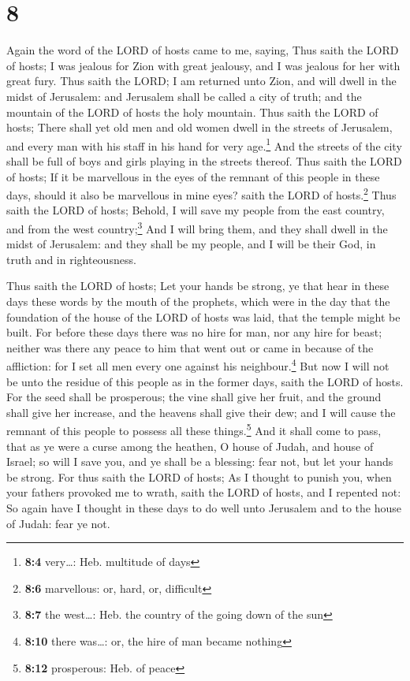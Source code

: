\hypertarget{section-7}{%
\section{8}\label{section-7}}

 Again the word of the LORD of hosts came to me, saying,
 Thus saith the LORD of hosts; I was jealous for Zion with
great jealousy, and I was jealous for her with great fury.
 Thus saith the LORD; I am returned unto Zion, and will
dwell in the midst of Jerusalem: and Jerusalem shall be called a city of
truth; and the mountain of the LORD of hosts the holy mountain.
 Thus saith the LORD of hosts; There shall yet old men and
old women dwell in the streets of Jerusalem, and every man with his
staff in his hand for very age.\footnote{\textbf{8:4} very\ldots: Heb.
  multitude of days}  And the streets of the city shall be
full of boys and girls playing in the streets thereof. 
Thus saith the LORD of hosts; If it be marvellous in the eyes of the
remnant of this people in these days, should it also be marvellous in
mine eyes? saith the LORD of hosts.\footnote{\textbf{8:6} marvellous:
  or, hard, or, difficult}  Thus saith the LORD of hosts;
Behold, I will save my people from the east country, and from the west
country;\footnote{\textbf{8:7} the west\ldots: Heb. the country of the
  going down of the sun}  And I will bring them, and they
shall dwell in the midst of Jerusalem: and they shall be my people, and
I will be their God, in truth and in righteousness.

 Thus saith the LORD of hosts; Let your hands be strong,
ye that hear in these days these words by the mouth of the prophets,
which were in the day that the foundation of the house of the LORD of
hosts was laid, that the temple might be built.  For
before these days there was no hire for man, nor any hire for beast;
neither was there any peace to him that went out or came in because of
the affliction: for I set all men every one against his
neighbour.\footnote{\textbf{8:10} there was\ldots: or, the hire of man
  became nothing}  But now I will not be unto the residue
of this people as in the former days, saith the LORD of hosts.
 For the seed shall be prosperous; the vine shall give
her fruit, and the ground shall give her increase, and the heavens shall
give their dew; and I will cause the remnant of this people to possess
all these things.\footnote{\textbf{8:12} prosperous: Heb. of peace}
 And it shall come to pass, that as ye were a curse among
the heathen, O house of Judah, and house of Israel; so will I save you,
and ye shall be a blessing: fear not, but let your hands be strong.
 For thus saith the LORD of hosts; As I thought to punish
you, when your fathers provoked me to wrath, saith the LORD of hosts,
and I repented not:  So again have I thought in these
days to do well unto Jerusalem and to the house of Judah: fear ye not.

